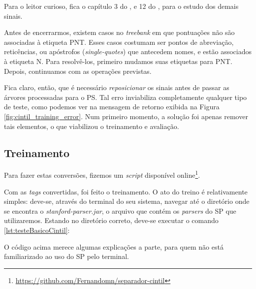 \begin{center}
    
\end{center}

Para o leitor curioso, fica o capítulo 3 do , e 12 do , para o estudo dos demais sinais.

Antes de encerrarmos, existem casos no \textit{treebank} em que pontuações não são associadas à etiqueta PNT. Esses casos costumam ser pontos de abreviação, reticências, ou apóstrofos (\textit{single-quotes}) que antecedem nomes, e estão associados à etiqueta N. Para resolvê-los, primeiro mudamos suas etiquetas para PNT. Depois, continuamos com as operações previstas.

Fica claro, então, que é necessário \textit{reposicionar} os sinais antes de passar as árvores processadas para o PS. 
Tal erro inviabiliza completamente qualquer tipo de teste, como podemos ver na mensagem de retorno exibida na Figura \ref{fig:cintil_training_error}. Num primeiro momento, a solução foi apenas remover tais elementos, o que viabilizou o treinamento e avaliação.

\begin{center}
    
\end{center}

\subsection{Treinamento}\label{subsec:treinamento_cintil}
Para fazer estas conversões, fizemos um \textit{script} disponível online\footnote{\url{ https://github.com/Fernandomn/separador-cintil}}.

Com as \textit{tags} convertidas, foi feito o treinamento. O ato do treino é relativamente simples: deve-se, através do terminal do seu sistema, navegar até o diretório onde se encontra o \textit{stanford-parser.jar}, o arquivo que contém os \textit{parsers} do SP que utilizaremos. Estando no diretório correto, deve-se executar o comando \ref{lst:testeBasicoCintil}:

\begin{center}

\end{center}

O código acima merece algumas explicações a parte, para quem não está familiarizado ao uso do SP pelo terminal.

